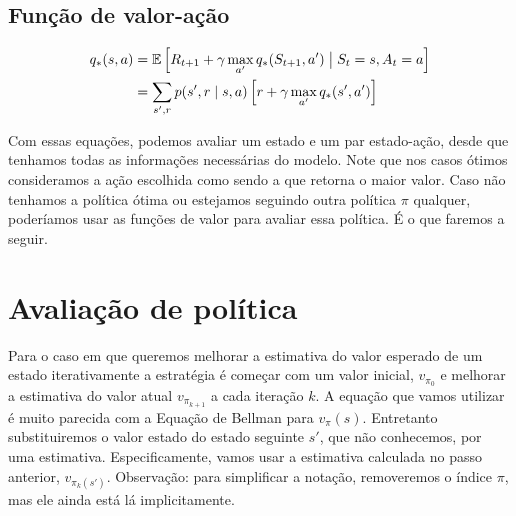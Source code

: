 \documentclass{article}
\begin{document}
        \subsection{Função de valor-ação}
    
            \begin{equation}
                \begin{split}
                    q_*(s,a) & = \mathbb{E} \left[ R_{t+1} + \gamma \max_{a'} q_*(S_{t+1}, a') \bigm\vert S_t = s, A_t = a \right] \\
                    & = \sum_{s', r} p(s',r \mid s,a) \left[ r + \gamma \max_{a'}q_*(s', a') \right]
                \end{split}
            \end{equation}
            
        Com essas equações, podemos avaliar um estado e um par estado-ação, desde que tenhamos todas as informações necessárias do modelo. Note que nos casos ótimos consideramos a ação escolhida como sendo a que retorna o maior valor. Caso não tenhamos a política ótima ou estejamos seguindo outra política $\pi$ qualquer, poderíamos usar as funções de valor para avaliar essa política. É o que faremos a seguir.
        
    \section{Avaliação de política}
    
        Para o caso em que queremos melhorar a estimativa do valor esperado de um estado iterativamente a estratégia é começar com um valor inicial, $v_{\pi_{0}}$ e melhorar a estimativa do valor atual $v_{\pi_{k+1}}$ a cada iteração $k$.
        A equação que vamos utilizar é muito parecida com a Equação de Bellman para $v_{\pi}(s)$. 
        Entretanto substituiremos o valor estado do estado seguinte $s'$, que não conhecemos, por uma estimativa.
        Especificamente, vamos usar a estimativa calculada no passo anterior, $v_{\pi_{k}(s')}$.
        Observação: para simplificar a notação, removeremos o índice $\pi$, mas ele ainda está lá implicitamente.
        
\end{document}
